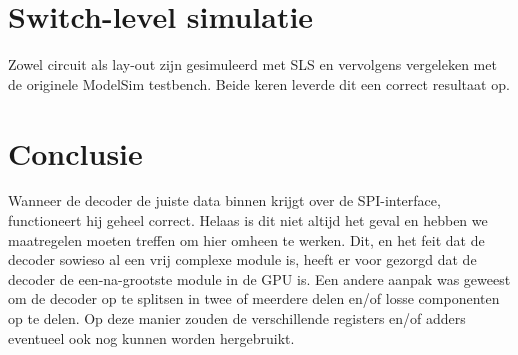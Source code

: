 \documentclass{scrartcl} %
\begin{document}
\section{Switch-level simulatie}
Zowel circuit als lay-out zijn gesimuleerd met SLS en vervolgens vergeleken met de originele ModelSim testbench. Beide keren leverde dit een correct resultaat op.

\section{Conclusie}
Wanneer de decoder de juiste data binnen krijgt over de SPI-interface, functioneert hij geheel correct. Helaas is dit niet altijd het geval en hebben we maatregelen moeten treffen om hier omheen te werken. Dit, en het feit dat de decoder sowieso al een vrij complexe module is, heeft er voor gezorgd dat de decoder de een-na-grootste module in de GPU is. Een andere aanpak was geweest om de decoder op te splitsen in twee of meerdere delen en/of losse componenten op te delen. Op deze manier zouden de verschillende registers en/of adders eventueel ook nog kunnen worden hergebruikt.
\end{document}
